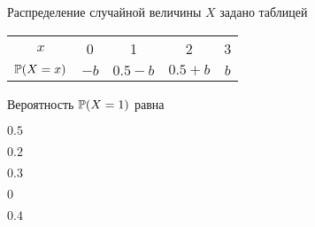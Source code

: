 
\begin{question}
Распределение случайной величины \(X\) задано таблицей

\begin{center}
\begin{tabular}{ccccc}
\toprule
$x$ & 0 & 1 & 2 & 3 \\ 
$\P(X=x)$ & $-b$ & $0.5-b$ & $0.5+b$ & $b$ \\
\bottomrule
\end{tabular}
\end{center}

Вероятность \(\P(X=1)\) равна
\begin{answerlist}
  \item \(0.5\)
  \item \(0.2\)
  \item \(0.3\)
  \item \(0\)
  \item \(0.4\)
\end{answerlist}
\end{question}


